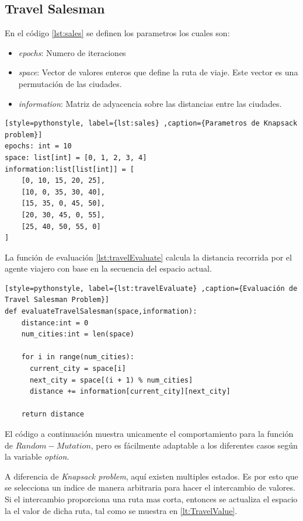 \documentclass[12pt,twoside]{article}
\begin{document}
\clearpage
\subsection{Travel Salesman}

En el código \ref{lst:sales} se definen los parametros los cuales son:
\begin{itemize}
	\item \textit{epochs}: Numero de iteraciones
	\item \textit{space}: Vector de valores enteros que define la ruta de viaje. Este vector es una permutación de las ciudades.
	\item \textit{information}: Matriz de adyacencia sobre las distancias entre las ciudades.  
\end{itemize}

\begin{lstlisting}[style=pythonstyle, label={lst:sales} ,caption={Parametros de Knapsack problem}]
epochs: int = 10
space: list[int] = [0, 1, 2, 3, 4]
information:list[list[int]] = [
	[0, 10, 15, 20, 25],  
	[10, 0, 35, 30, 40],  
	[15, 35, 0, 45, 50],  
	[20, 30, 45, 0, 55],  
	[25, 40, 50, 55, 0] 
]
\end{lstlisting}

La función de evaluación \ref{lst:travelEvaluate} calcula la distancia recorrida por el agente viajero con base en la secuencia del espacio actual. 

\begin{lstlisting}[style=pythonstyle, label={lst:travelEvaluate} ,caption={Evaluación de Travel Salesman Problem}]
def evaluateTravelSalesman(space,information):
	distance:int = 0
	num_cities:int = len(space)
	
	for i in range(num_cities):
	  current_city = space[i]
	  next_city = space[(i + 1) % num_cities]  
	  distance += information[current_city][next_city]
	
	return distance
\end{lstlisting}

El código a continuación muestra unicamente el comportamiento para la función de $Random-Mutation$, pero es fácilmente adaptable a los diferentes casos según la variable \textit{option}.

A diferencia de \textit{Knapsack problem}, aquí existen multiples estados. Es por esto que se selecciona un indice de manera arbitraria para hacer el intercambio de valores. Si el intercambio proporciona una ruta mas corta, entonces se actualiza el espacio la el valor de dicha ruta, tal como se muestra en \ref{lt:TravelValue}.  
\end{document}
